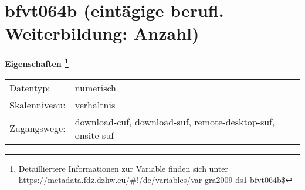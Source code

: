 
    \setcounter{footnote}{0}

    \vspace*{-1.8cm}
	\section{bfvt064b (eintägige berufl. Weiterbildung: Anzahl)}
	\label{section:bfvt064b}



    \vspace*{0.5cm}
    \noindent\textbf{Eigenschaften
	\footnote{Detailliertere Informationen zur Variable finden sich unter
		\url{https://metadata.fdz.dzhw.eu/\#!/de/variables/var-gra2009-ds1-bfvt064b$}}}\\
	\begin{tabularx}{\hsize}{@{}lX}
	Datentyp: & numerisch \\
	Skalenniveau: & verhältnis \\
	Zugangswege: &
	  download-cuf, 
	  download-suf, 
	  remote-desktop-suf, 
	  onsite-suf
 \\
    \end{tabularx}



